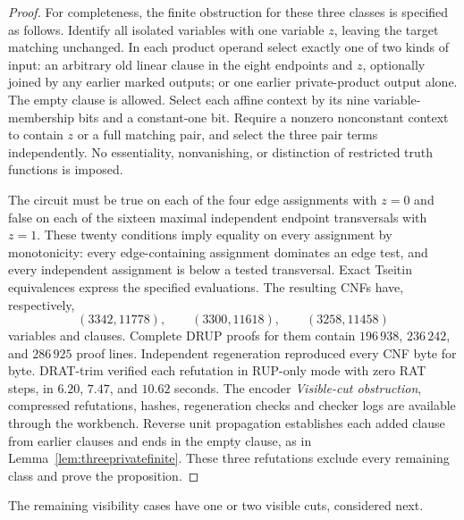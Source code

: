 \begin{proof}
For completeness, the finite obstruction for these three classes is specified as follows. Identify all isolated variables with one variable $z$, leaving the target matching unchanged. In each product operand select exactly one of two kinds of input: an arbitrary old linear clause in the eight endpoints and $z$, optionally joined by any earlier marked outputs; or one earlier private-product output alone. The empty clause is allowed. Select each affine context by its nine variable-membership bits and a constant-one bit. Require a nonzero nonconstant context to contain $z$ or a full matching pair, and select the three pair terms independently. No essentiality, nonvanishing, or distinction of restricted truth functions is imposed.

The circuit must be true on each of the four edge assignments with $z=0$ and false on each of the sixteen maximal independent endpoint transversals with $z=1$. These twenty conditions imply equality on every assignment by monotonicity: every edge-containing assignment dominates an edge test, and every independent assignment is below a tested transversal. Exact Tseitin equivalences express the specified evaluations. The resulting CNFs have, respectively,
\[
 (3342,11778),\qquad(3300,11618),\qquad(3258,11458)
\]
variables and clauses. Complete DRUP proofs for them contain $196\,938$, $236\,242$, and $286\,925$ proof lines. Independent regeneration reproduced every CNF byte for byte. DRAT-trim verified each refutation in RUP-only mode with zero RAT steps, in $6.20$, $7.47$, and $10.62$ seconds. The encoder \emph{Visible-cut obstruction}, compressed refutations, hashes, regeneration checks and checker logs are available through the workbench. Reverse unit propagation establishes each added clause from earlier clauses and ends in the empty clause, as in Lemma~\ref{lem:threeprivatefinite}. These three refutations exclude every remaining class and prove the proposition.
\end{proof}

The remaining visibility cases have one or two visible cuts, considered next.
